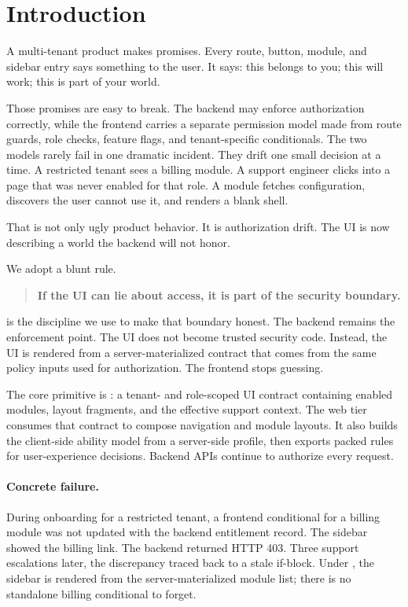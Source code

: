 \section{Introduction}
\label{sec:introduction}

A multi-tenant product makes promises. Every route, button, module, and sidebar entry says something to the user. It says: this belongs to you; this will work; this is part of your world.

Those promises are easy to break. The backend may enforce authorization correctly, while the frontend carries a separate permission model made from route guards, role checks, feature flags, and tenant-specific conditionals. The two models rarely fail in one dramatic incident. They drift one small decision at a time. A restricted tenant sees a billing module. A support engineer clicks into a page that was never enabled for that role. A module fetches configuration, discovers the user cannot use it, and renders a blank shell.

That is not only ugly product behavior. It is authorization drift. The UI is now describing a world the backend will not honor.

We adopt a blunt rule.

\begin{quote}
\textbf{If the UI can lie about access, it is part of the security boundary.}
\end{quote}

\uiPolicy{} is the discipline we use to make that boundary honest. The backend remains the enforcement point. The UI does not become trusted security code. Instead, the UI is rendered from a server-materialized contract that comes from the same policy inputs used for authorization. The frontend stops guessing.

The core primitive is \uiData{}: a tenant- and role-scoped UI contract containing enabled modules, layout fragments, and the effective support context. The web tier consumes that contract to compose navigation and module layouts. It also builds the client-side ability model from a server-side profile, then exports packed rules for user-experience decisions. Backend APIs continue to authorize every request.

\paragraph{Concrete failure.}
During onboarding for a restricted tenant, a frontend conditional for a billing module was not updated with the backend entitlement record. The sidebar showed the billing link. The backend returned HTTP 403. Three support escalations later, the discrepancy traced back to a stale if-block. Under \uiPolicy{}, the sidebar is rendered from the server-materialized module list; there is no standalone billing conditional to forget.

